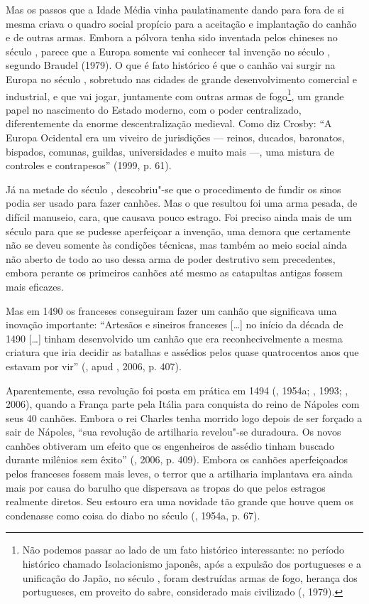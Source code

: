 Mas os passos que a Idade Média vinha paulatinamente dando para fora de
si mesma criava o quadro social propício para a aceitação e implantação
do canhão e de outras armas. Embora a pólvora tenha sido inventada pelos
chineses no século , parece que a Europa somente vai conhecer tal
invenção no século , segundo Braudel (1979). O que é fato histórico
é que o canhão vai surgir na Europa no século , sobretudo nas cidades
de grande desenvolvimento comercial e industrial, e que vai jogar,
juntamente com outras armas de fogo\footnote{Não podemos passar ao lado
  de um fato histórico interessante: no período
  histórico chamado Isolacionismo japonês, após a expulsão dos
  portugueses e a unificação do Japão, no século , foram destruídas
  armas de fogo, herança dos portugueses, em proveito do sabre,
  considerado mais civilizado (, 1979).}, um grande papel no
nascimento do Estado moderno, com o poder centralizado, diferentemente
da enorme descentralização medieval. Como diz Crosby: ``A Europa
Ocidental era um viveiro de jurisdições --- reinos, ducados, baronatos,
bispados, comunas, guildas, universidades e muito mais ---, uma mistura
de controles e contrapesos'' (1999, p. 61).

Já na metade do século , descobriu"-se que o procedimento de fundir os
sinos podia ser usado para fazer canhões. Mas o que resultou foi uma
arma pesada, de difícil manuseio, cara, que causava pouco estrago. Foi
preciso ainda mais de um século para que se pudesse aperfeiçoar a
invenção, uma demora que certamente não se deveu somente às condições
técnicas, mas também ao meio social ainda não aberto de todo ao uso
dessa arma de poder destrutivo sem precedentes, embora perante os
primeiros canhões até mesmo as catapultas antigas fossem mais eficazes.

Mas em 1490 os franceses conseguiram fazer um canhão que significava uma
inovação importante: ``Artesãos e sineiros franceses [\ldots{}] no
início da década de 1490 [\ldots{}] tinham desenvolvido um canhão
que era reconhecivelmente a mesma criatura que iria decidir as batalhas
e assédios pelos quase quatrocentos anos que estavam por vir'' (,
apud , 2006, p. 407).

Aparentemente, essa revolução foi posta em prática em 1494 (, 1954a;
, 1993; , 2006), quando a França parte pela Itália para
conquista do reino de Nápoles com seus 40 canhões. Embora o rei Charles
 tenha morrido logo depois de ser forçado a sair de Nápoles, ``sua
revolução de artilharia revelou"-se duradoura. Os novos canhões obtiveram
um efeito que os engenheiros de assédio tinham buscado durante milênios
sem êxito'' (, 2006, p. 409). Embora os canhões aperfeiçoados
pelos franceses fossem mais leves, o terror que a artilharia implantava
era ainda mais por causa do barulho que dispersava as tropas do que
pelos estragos realmente diretos. Seu estouro era uma novidade tão
grande que houve quem os condenasse como coisa do diabo no século 
(, 1954a, p. 67).

